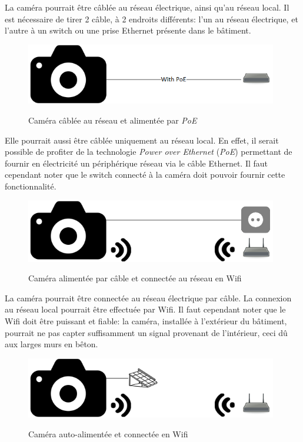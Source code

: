 La caméra pourrait être câblée au réseau électrique, ainsi qu'au réseau local. Il est nécessaire de tirer 2 câble, à 2 endroits différents: l'un au réseau électrique, et l'autre à un switch ou une prise Ethernet présente dans le bâtiment.

\begin{figure}[H]
    \includegraphics[width=110mm]{img/conception/cam_con_2.png}
    \label{fig:cam_connection_2}
    \centering
    \caption{Caméra câblée au réseau et alimentée par \textit{PoE}}
\end{figure}

Elle pourrait aussi être câblée uniquement au réseau local. En effet, il serait possible de profiter de la technologie \textit{Power over Ethernet} (\textit{PoE}) permettant de fournir en électricité un périphérique réseau via le câble Ethernet. Il faut cependant noter que le switch connecté à la caméra doit pouvoir fournir cette fonctionnalité.

\begin{figure}[H]
    \includegraphics[width=110mm]{img/conception/cam_con_3.png}
    \label{fig:cam_connection_3}
    \centering
    \caption{Caméra alimentée par câble et connectée au réseau en Wifi}
\end{figure}

La caméra pourrait être connectée au réseau électrique par câble. La connexion au réseau local pourrait être effectuée par Wifi. Il faut cependant noter que le Wifi doit être puissant et fiable: la caméra, installée à l'extérieur du bâtiment, pourrait ne pas capter suffisamment un signal provenant de l'intérieur, ceci dû aux larges murs en bêton. 

\begin{figure}[H]
    \includegraphics[width=110mm]{img/conception/cam_con_4.png}
    \label{fig:cam_connection_4}
    \centering
    \caption{Caméra auto-alimentée et connectée en Wifi}
\end{figure}

